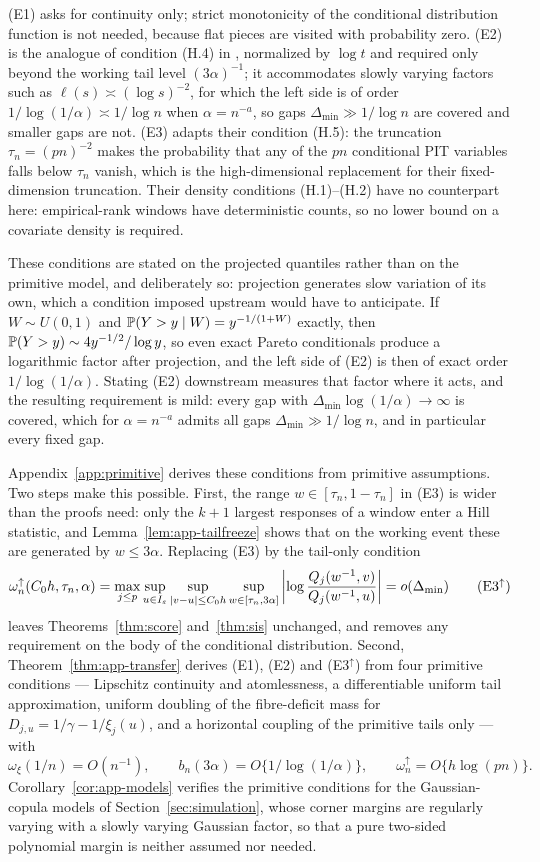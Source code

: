 \documentclass[bj,authoryear]{imsart}
\theoremstyle{plain}
\begin{document}
(E1) asks for continuity only; strict monotonicity of the conditional
distribution function is not needed, because flat pieces are visited with
probability zero. (E2) is the analogue of condition (H.4) in
\citet{gardesPodgorny2025}, normalized by $\log t$ and required only beyond
the working tail level $(3\alpha)^{-1}$; it accommodates slowly varying
factors such as $\ell(s)\asymp(\log s)^{-2}$, for which the left side is of
order $1/\log(1/\alpha)\asymp1/\log n$ when $\alpha=n^{-a}$, so gaps
$\Delta_{\min}\gg1/\log n$ are covered and smaller gaps are not. (E3)
adapts their condition (H.5): the truncation $\tau_n=(pn)^{-2}$ makes the
probability that any of the $pn$ conditional PIT variables falls below
$\tau_n$ vanish, which is the high-dimensional replacement for their
fixed-dimension truncation. Their density conditions (H.1)--(H.2)
have no counterpart here: empirical-rank windows have deterministic counts,
so no lower bound on a covariate density is required.

These conditions are stated on the projected quantiles rather than on
the primitive model, and deliberately so: projection generates slow
variation of its own, which a condition imposed upstream would have to
anticipate. If $W\sim U(0,1)$ and $\mathbb P(Y>y\mid W)=y^{-1/(1+W)}$
exactly, then $\mathbb P(Y>y)\sim4y^{-1/2}/\log y$, so even exact Pareto
conditionals produce a logarithmic factor after projection, and the
left side of (E2) is then of exact order $1/\log(1/\alpha)$. Stating
(E2) downstream measures that factor where it acts, and the resulting
requirement is mild: every gap with $\Delta_{\min}\log(1/\alpha)
\to\infty$ is covered, which for $\alpha=n^{-a}$ admits all gaps
$\Delta_{\min}\gg1/\log n$, and in particular every fixed gap.

Appendix~\ref{app:primitive} derives these conditions from primitive
assumptions. Two steps make this possible. First, the range
$w\in[\tau_n,1-\tau_n]$ in (E3) is wider than the proofs need: only the
$k+1$ largest responses of a window enter a Hill statistic, and
Lemma~\ref{lem:app-tailfreeze} shows that on the working event these are
generated by $w\le3\alpha$. Replacing (E3) by the tail-only condition
\[
 \omega_n^{\uparrow}(C_0h,\tau_n,\alpha)
 =\max_{j\le p}\sup_{u\in\I}
 \sup_{|v-u|\le C_0h}\sup_{w\in[\tau_n,3\alpha]}
 \left|\log\frac{Q_j(w^{-1},v)}{Q_j(w^{-1},u)}\right|
 =o(\Delta_{\min})
 \tag{E3$^{\uparrow}$}
\]
leaves Theorems~\ref{thm:score} and~\ref{thm:sis} unchanged, and removes
any requirement on the body of the conditional distribution. Second,
Theorem~\ref{thm:app-transfer} derives (E1), (E2) and (E3$^{\uparrow}$)
from four primitive conditions --- Lipschitz continuity and
atomlessness, a differentiable uniform tail approximation, uniform
doubling of the fibre-deficit mass for
$D_{j,u}=1/\gamma-1/\xi_j(u)$, and a horizontal coupling of the
primitive tails only --- with
\[
 \omega_\xi(1/n)=O(n^{-1}),
 \qquad
 b_n(3\alpha)=O\{1/\log(1/\alpha)\},
 \qquad
 \omega_n^{\uparrow}=O\{h\log(pn)\}.
\]
Corollary~\ref{cor:app-models} verifies the primitive conditions for the
Gaussian-copula models of Section~\ref{sec:simulation}, whose corner
margins are regularly varying with a slowly varying Gaussian factor, so
that a pure two-sided polynomial margin is neither assumed nor needed.
\end{document}
